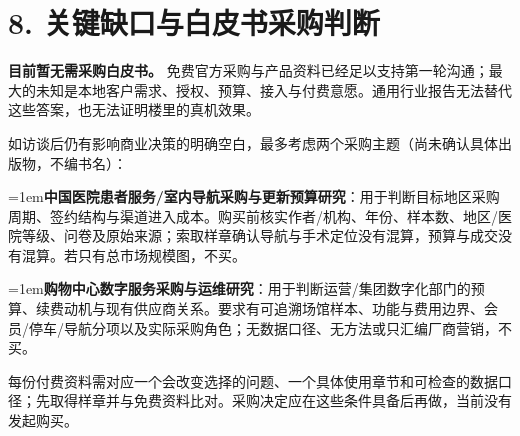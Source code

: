 \documentclass[UTF8,10pt,fontset=fandol]{ctexart}
\begin{document}
\section*{8. 关键缺口与白皮书采购判断}
\textbf{目前暂无需采购白皮书。} 免费官方采购与产品资料已经足以支持第一轮沟通；最大的未知是本地客户需求、授权、预算、接入与付费意愿。通用行业报告无法替代这些答案，也无法证明楼里的真机效果。\par
如访谈后仍有影响商业决策的明确空白，最多考虑两个采购主题（尚未确认具体出版物，不编书名）：\par
\par\hangindent=1em\textcolor{brand}{\textbullet}\quad \textbf{中国医院患者服务/室内导航采购与更新预算研究}：用于判断目标地区采购周期、签约结构与渠道进入成本。购买前核实作者/机构、年份、样本数、地区/医院等级、问卷及原始来源；索取样章确认导航与手术定位没有混算，预算与成交没有混算。若只有总市场规模图，不买。\par
\par\hangindent=1em\textcolor{brand}{\textbullet}\quad \textbf{购物中心数字服务采购与运维研究}：用于判断运营/集团数字化部门的预算、续费动机与现有供应商关系。要求有可追溯场馆样本、功能与费用边界、会员/停车/导航分项以及实际采购角色；无数据口径、无方法或只汇编厂商营销，不买。\par
每份付费资料需对应一个会改变选择的问题、一个具体使用章节和可检查的数据口径；先取得样章并与免费资料比对。采购决定应在这些条件具备后再做，当前没有发起购买。\par
\clearpage
\end{document}
